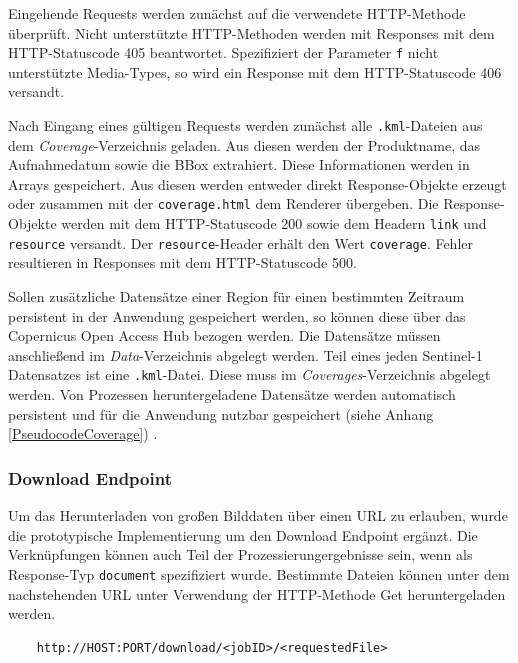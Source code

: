 Eingehende Requests werden zunächst auf die verwendete HTTP-Methode überprüft. Nicht unterstützte HTTP-Methoden werden 
mit Responses mit dem HTTP-Statuscode 405 beantwortet. Spezifiziert der Parameter \verb|f| nicht unterstützte Media-Types, so wird ein Response mit dem 
HTTP-Statuscode 406 versandt. 

Nach Eingang eines gültigen Requests werden zunächst alle \verb|.kml|-Dateien aus dem \emph{Coverage}-Verzeichnis geladen. Aus diesen werden der Produktname, das Aufnahmedatum 
sowie die BBox extrahiert. Diese Informationen werden in Arrays gespeichert. Aus diesen werden entweder direkt Response-Objekte erzeugt oder zusammen mit der 
\verb|coverage.html| dem Renderer übergeben. Die Response-Objekte werden mit dem HTTP-Statuscode 200 sowie dem Headern \verb|link| und \verb|resource| versandt. 
Der \verb|resource|-Header erhält den Wert \verb|coverage|. Fehler resultieren in Responses mit dem HTTP-Statuscode 500. 

Sollen zusätzliche Datensätze einer Region für einen bestimmten Zeitraum persistent in der Anwendung gespeichert werden, so können diese über das 
Copernicus Open Access Hub bezogen werden. Die Datensätze müssen anschließend im \emph{Data}-Verzeichnis abgelegt werden. Teil eines jeden Sentinel-1 Datensatzes 
ist eine \verb|.kml|-Datei. Diese muss im \emph{Coverages}-Verzeichnis  abgelegt werden. Von Prozessen heruntergeladene Datensätze werden automatisch persistent und 
für die Anwendung nutzbar gespeichert (siehe Anhang \ref{PseudocodeCoverage}) \cite{code}. 

\subsubsection{Download Endpoint}
Um das Herunterladen von großen Bilddaten über einen URL zu erlauben, wurde die prototypische Implementierung um den Download Endpoint ergänzt.
Die Verknüpfungen können auch Teil der Prozessierungergebnisse sein, wenn als Response-Typ \verb|document| spezifiziert wurde. 
Bestimmte Dateien können unter dem nachstehenden URL unter Verwendung der HTTP-Methode Get heruntergeladen werden.

\begin{center}
\begin{BVerbatim}
    http://HOST:PORT/download/<jobID>/<requestedFile>
\end{BVerbatim}
\end{center}

